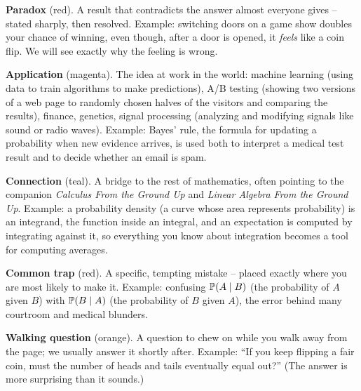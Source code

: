\begin{paradoxbox}
\textbf{Paradox} (red). A result that contradicts the answer almost everyone
gives -- stated sharply, then resolved. Example: switching doors on a game show
doubles your chance of winning, even though, after a door is opened, it
\emph{feels} like a coin flip. We will see exactly why the feeling is wrong.
\end{paradoxbox}

\begin{applicationbox}
\textbf{Application} (magenta). The idea at work in the world: machine
learning (using data to train algorithms to make predictions), A/B testing (showing two versions of a web page to randomly chosen
halves of the visitors and comparing the results), finance, genetics, signal
processing (analyzing and modifying signals like sound or radio waves). Example: Bayes' rule, the formula for updating a probability when
new evidence arrives, is used both to interpret a medical test result and to
decide whether an email is spam.
\end{applicationbox}

\begin{connectionbox}
\textbf{Connection} (teal). A bridge to the rest of mathematics, often pointing
to the companion \emph{Calculus From the Ground Up} and \emph{Linear Algebra
From the Ground Up}. Example: a probability density (a curve whose area represents
probability) is an integrand, the function inside an integral, and an
expectation is computed by integrating against it, so everything you know about
integration becomes a tool for computing averages.
\end{connectionbox}

\begin{trapbox}
\textbf{Common trap} (red). A specific, tempting mistake -- placed exactly where
you are most likely to make it. Example: confusing $\operatorname{\mathbb{P}}(A \mid B)$ (the
probability of $A$ given $B$) with $\operatorname{\mathbb{P}}(B \mid A)$ (the probability of $B$
given $A$), the error behind many courtroom and medical blunders.
\end{trapbox}

\begin{walkbox}
\textbf{Walking question} (orange). A question to chew on while you walk away
from the page; we usually answer it shortly after. Example: ``If you keep
flipping a fair coin, must the number of heads and tails eventually equal out?''
(The answer is more surprising than it sounds.)
\end{walkbox}

